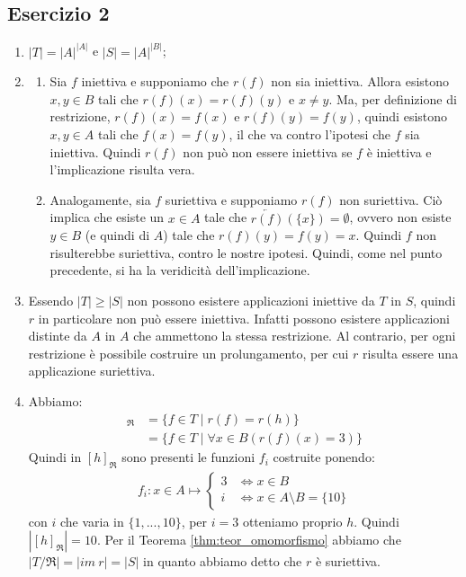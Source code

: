 \subsection*{Esercizio 2}
\begin{enumerate}[label=(\textit{\roman*})]
	\item $|T|=|A|^{|A|}$ e $|S|=|A|^{|B|}$;
	\item \begin{enumerate}[label=(\alph*)]
		\item Sia $f$ iniettiva e supponiamo che $r(f)$ non sia iniettiva. Allora esistono $x,y \in B$ tali che $r(f)(x) =r(f)(y)$ e $x \neq y$. Ma, per definizione di restrizione, $r(f)(x) = f(x)$ e $r(f)(y)=f(y)$, quindi esistono $x,y \in A$ tali che $f(x)=f(y)$, il che va contro l'ipotesi che $f$ sia iniettiva. Quindi $r(f)$ non può non essere iniettiva se $f$ è iniettiva e l'implicazione risulta vera.
		\item Analogamente, sia $f$ suriettiva e supponiamo $r(f)$ non suriettiva. Ciò implica che esiste un $x \in A$ tale che $\overleftarrow{r(f)}(\{x\})=\emptyset$, ovvero non esiste $y \in B$ (e quindi di $A$) tale che $r(f)(y)=f(y)=x$. Quindi $f$ non risulterebbe suriettiva, contro le nostre ipotesi. Quindi, come nel punto precedente, si ha la veridicità dell'implicazione.
	\end{enumerate}
\item Essendo $|T| \geq |S|$ non possono esistere applicazioni iniettive da $T$ in $S$, quindi $r$ in particolare non può essere iniettiva. Infatti possono esistere applicazioni distinte da $A$ in $A$ che ammettono la stessa restrizione. Al contrario, per ogni restrizione è possibile costruire un prolungamento, per cui $r$ risulta essere una applicazione suriettiva.
\item Abbiamo:
\begin{align*}
	[h]_{\mathfrak{R}} &= \{ f \in T \; | \; r(f) = r(h)\} \\
	&= \{ f \in T \; | \; \forall x \in B (r(f)(x) = 3)\}
\end{align*}
Quindi in $[h]_{\mathfrak{R}}$ sono presenti le funzioni $f_{i}$ costruite ponendo:
\begin{align*}
	f_{i}: x \in A \mapsto \begin{cases*}
		3 & \iff x \in B \\
		i & \iff x \in A \setminus B = \{10\}
	\end{cases*}
\end{align*}
con $i$ che varia in $\{1,...,10\}$, per $i=3$ otteniamo proprio $h$. Quindi $|[h]_{\mathfrak{R}}| = 10$. Per il Teorema \ref{thm:teor_omomorfismo} abbiamo che $|T/{\mathfrak{R}}|=| im \ r| = |S|$ in quanto abbiamo detto che $r$ è suriettiva.
\end{enumerate}
